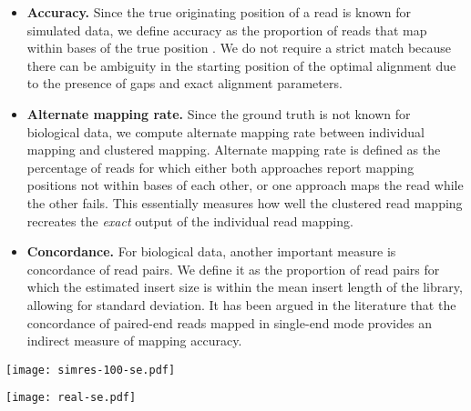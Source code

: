 \documentclass[a4paper]{article}
\begin{document}
\begin{itemize}
  \setlength{\itemsep}{1pt}
  \setlength{\parskip}{0pt}
  \setlength{\parsep}{0pt}
\item {\bf Accuracy.} Since the true originating
position of a read
is known for simulated data, we define accuracy as the proportion of reads that
map within  bases of the true position \cite{Hamada:2011bg}. We do
not require a
strict match because there can be
ambiguity in the starting position of the optimal alignment
due to the presence of gaps and exact alignment parameters.

\item {\bf Alternate mapping rate.} Since the ground truth is not known for biological data, we compute alternate mapping rate between individual mapping and clustered mapping. Alternate mapping rate is defined as the percentage of reads for which either both approaches
report mapping positions not within  bases of each other, or one approach maps the read while the other fails. 
This essentially measures how well the clustered read mapping recreates the {\em exact} output of the individual read mapping.

\item {\bf Concordance.} For biological data, another
important measure is concordance of read pairs. We define it as the
proportion of read pairs for which the estimated insert size is within
the mean insert length of the library, allowing for  standard
deviation. It has been argued in the literature \cite{Lunter2011} that
the concordance of paired-end reads mapped in single-end mode provides an
indirect measure of mapping accuracy.
\end{itemize}


\begin{figure*}
\centering
\texttt{[image: simres-100-se.pdf]}
\caption{\label{fig:sim_res_se}
{\bf Quality improvements in detecting SNPs and structural variants.}
    Accuracy of mapping single-end simulated reads between individual and clustered approach
    is shown. As expected, BWA and Bowtie 2 do not perform very well in presence
    of large variations. Clustered read mapping performs significantly better
    than individual BWA and Bowtie 2, and generally agrees with the individual version
    of the sensitive readmappers.
}
\end{figure*}


\begin{figure*}
  \centering
  \texttt{[image: real-se.pdf]}
  \caption{ \label{fig:real-se}
  {\bf Alternate mapping rate between clustered and individual single-end read mapping.} Alternate mapping rate is shown as a function of MAPQ threshold. Maximum reported MAPQ value varies between readmappers; for BWA, Bowtie 2, Novoalign and Stampy maximum reported MAPQ for single-end reads are respectively 37, 42, 150 and 96. The cutoffs used to report alternate mapping rate in Table~\ref{runtime-se} are shown with diamond signs in the inset figures.}
  \vspace{-4mm}
\end{figure*}
\end{document}
